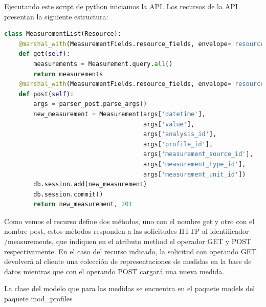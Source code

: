 Ejecutando este script de python iniciamos la API.
Los recursos de la API presentan la siguiente estructura:

\begin{lstlisting}[language=Python]
class MeasurementList(Resource):
    @marshal_with(MeasurementFields.resource_fields, envelope='resource')
    def get(self):
        measurements = Measurement.query.all()
        return measurements
    @marshal_with(MeasurementFields.resource_fields, envelope='resource')
    def post(self):
        args = parser_post.parse_args()
        new_measurement = Measurement(args['datetime'],
                                      args['value'],
                                      args['analysis_id'],
                                      args['profile_id'],
                                      args['measurement_source_id'],
                                      args['measurement_type_id'],
                                      args['measurement_unit_id'])
        db.session.add(new_measurement)
        db.session.commit()
        return new_measurement, 201
\end{lstlisting}

Como vemos el recurso define dos métodos, uno con el nombre get y otro con el nombre post, estos métodos responden a las solicitudes HTTP al identificador /measurements, que indiquen en el atributo method el operador GET y POST respectivamente. En el caso del recurso indicado, la solicitud con operando GET devolverá al cliente una colección de representaciones de medidas en la base de datos mientras que con el operando POST cargará una nueva medida.

La clase del modelo que para las medidas se encuentra en el paquete models del paquete mod\_profiles

